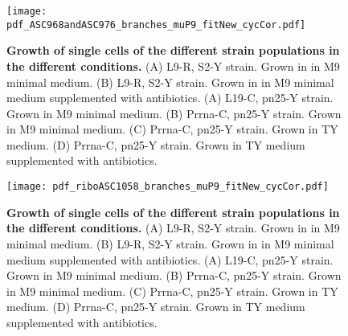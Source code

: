 \begin{figure}
    \centering
    \texttt{[image: pdf\_ASC968andASC976\_branches\_muP9\_fitNew\_cycCor.pdf]}
    \caption{ 
        \textbf{Growth of single cells of the different strain populations in the different conditions.}
        (A) L9-R, S2-Y strain. Grown in in M9 minimal medium.
        (B) L9-R, S2-Y strain. Grown in in M9 minimal medium supplemented with antibiotics. 
        (A) L19-C, pn25-Y strain. Grown in M9 minimal medium.
        (B) Prrna-C, pn25-Y strain. Grown in M9 minimal medium.
        (C) Prrna-C, pn25-Y strain. Grown in TY medium.
        (D) Prrna-C, pn25-Y strain. Grown in TY medium supplemented with antibiotics.
    }
    \label{fig:ribo:branchesASC968andASC976}
\end{figure}



\begin{figure}
    \centering
    \texttt{[image: pdf\_riboASC1058\_branches\_muP9\_fitNew\_cycCor.pdf]}
    \caption{ 
        \textbf{Growth of single cells of the different strain populations in the different conditions.}
        (A) L9-R, S2-Y strain. Grown in in M9 minimal medium.
        (B) L9-R, S2-Y strain. Grown in in M9 minimal medium supplemented with antibiotics. 
        (A) L19-C, pn25-Y strain. Grown in M9 minimal medium.
        (B) Prrna-C, pn25-Y strain. Grown in M9 minimal medium.
        (C) Prrna-C, pn25-Y strain. Grown in TY medium.
        (D) Prrna-C, pn25-Y strain. Grown in TY medium supplemented with antibiotics.
    }
    \label{fig:ribo:branchesASC1058}
\end{figure}


